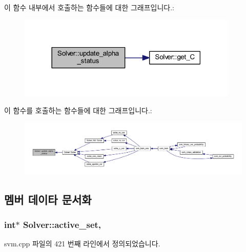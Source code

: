 이 함수 내부에서 호출하는 함수들에 대한 그래프입니다.\+:
\nopagebreak
\begin{figure}[H]
\begin{center}
\leavevmode
\includegraphics[width=297pt]{class_solver_a5a978b4ff9b60b2d75e54970fd6a2c20_cgraph}
\end{center}
\end{figure}




이 함수를 호출하는 함수들에 대한 그래프입니다.\+:
\nopagebreak
\begin{figure}[H]
\begin{center}
\leavevmode
\includegraphics[width=350pt]{class_solver_a5a978b4ff9b60b2d75e54970fd6a2c20_icgraph}
\end{center}
\end{figure}




\subsection{멤버 데이타 문서화}
\hypertarget{class_solver_a6382277606a9b3df3d2f0ac947e1cde3}{
\subsubsection[{active\+\_\+set}]{\setlength{\rightskip}{0pt plus 5cm}int$\ast$ Solver\+::active\+\_\+set\hspace{0.3cm}{\ttfamily [protected]}, {\ttfamily [inherited]}}}\label{class_solver_a6382277606a9b3df3d2f0ac947e1cde3}


svm.\+cpp 파일의 421 번째 라인에서 정의되었습니다.

